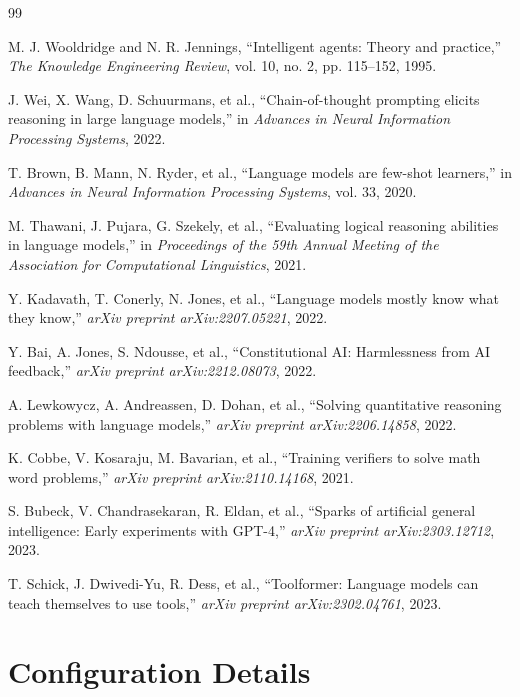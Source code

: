 \documentclass[conference]{IEEEtran}
\begin{document}
\begin{thebibliography}{99}

M. J. Wooldridge and N. R. Jennings, ``Intelligent agents: Theory and practice,'' \emph{The Knowledge Engineering Review}, vol. 10, no. 2, pp. 115--152, 1995.

J. Wei, X. Wang, D. Schuurmans, et al., ``Chain-of-thought prompting elicits reasoning in large language models,'' in \emph{Advances in Neural Information Processing Systems}, 2022.

T. Brown, B. Mann, N. Ryder, et al., ``Language models are few-shot learners,'' in \emph{Advances in Neural Information Processing Systems}, vol. 33, 2020.

M. Thawani, J. Pujara, G. Szekely, et al., ``Evaluating logical reasoning abilities in language models,'' in \emph{Proceedings of the 59th Annual Meeting of the Association for Computational Linguistics}, 2021.

Y. Kadavath, T. Conerly, N. Jones, et al., ``Language models mostly know what they know,'' \emph{arXiv preprint arXiv:2207.05221}, 2022.

Y. Bai, A. Jones, S. Ndousse, et al., ``Constitutional AI: Harmlessness from AI feedback,'' \emph{arXiv preprint arXiv:2212.08073}, 2022.

A. Lewkowycz, A. Andreassen, D. Dohan, et al., ``Solving quantitative reasoning problems with language models,'' \emph{arXiv preprint arXiv:2206.14858}, 2022.

K. Cobbe, V. Kosaraju, M. Bavarian, et al., ``Training verifiers to solve math word problems,'' \emph{arXiv preprint arXiv:2110.14168}, 2021.

S. Bubeck, V. Chandrasekaran, R. Eldan, et al., ``Sparks of artificial general intelligence: Early experiments with GPT-4,'' \emph{arXiv preprint arXiv:2303.12712}, 2023.

T. Schick, J. Dwivedi-Yu, R. Dess, et al., ``Toolformer: Language models can teach themselves to use tools,'' \emph{arXiv preprint arXiv:2302.04761}, 2023.

\end{thebibliography}

\appendix

\section{Configuration Details}
\end{document}
